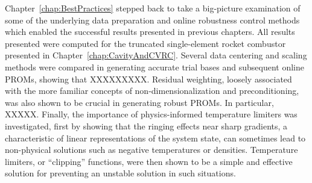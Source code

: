 Chapter~\ref{chap:BestPractices} stepped back to take a big-picture examination of some of the underlying data preparation and online robustness control methods which enabled the successful results presented in previous chapters. All results presented were computed for the truncated single-element rocket combustor presented in Chapter~\ref{chap:CavityAndCVRC}. Several data centering and scaling methods were compared in generating accurate trial bases and subsequent online PROMs, showing that {\color{red}XXXXXXXXX}. Residual weighting, loosely associated with the more familiar concepts of non-dimensionalization and preconditioning, was also shown to be crucial in generating robust PROMs. In particular, {\color{red}XXXXX}. Finally, the importance of physics-informed temperature limiters was investigated, first by showing that the ringing effects near sharp gradients, a characteristic of linear representations of the system state, can sometimes lead to non-physical solutions such as negative temperatures or densities. Temperature limiters, or ``clipping'' functions, were then shown to be a simple and effective solution for preventing an unstable solution in such situations.

% 